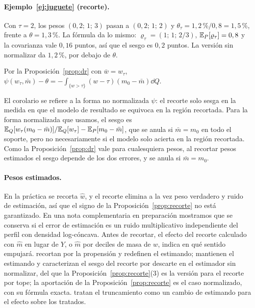 \paragraph{Ejemplo~\ref{ej:juguete} (recorte).} Con $\tau=2$, los pesos $(0,2;\,1;\,3)$ pasan a $(0,2;\,1;\,2)$ y $\theta_\tau=1,2\,\%/0,8=1,5\,\%$, frente a $\theta=1,3\,\%$. La fórmula da lo mismo: $\varrho_\tau=(1;\,1;\,2/3)$, $\mathbb{E}_P[\varrho_\tau]=0,8$ y la covarianza vale $0,16$ puntos, así que el sesgo es $0,2$ puntos. La versión sin normalizar da $1,2\,\%$, por debajo de $\theta$.

\begin{corolario}\label{cor:drrecorte}
Por la Proposición~\ref{prop:dr} con $\bar w=w_\tau$, $\psi(w_\tau,\bar m)-\theta=-\int_{\{w>\tau\}}(w-\tau)(m_0-\bar m)\dd Q$.
\end{corolario}
El corolario se refiere a la forma no normalizada $\psi$: el recorte solo sesga en la medida en que el modelo de resultado se equivoca en la región recortada. Para la forma normalizada que usamos, el sesgo es $\mathbb{E}_Q[w_\tau(m_0-\bar m)]/\mathbb{E}_Q[w_\tau]-\mathbb{E}_P[m_0-\bar m]$, que se anula si $\bar m=m_0$ en todo el soporte, pero no necesariamente si el modelo solo acierta en la región recortada. Como la Proposición~\ref{prop:dr} vale para cualesquiera pesos, al recortar pesos estimados el sesgo depende de los dos errores, y se anula si $\bar m=m_0$.

\paragraph{Pesos estimados.} En la práctica se recorta $\hat w$, y el recorte elimina a la vez peso verdadero y ruido de estimación, así que el signo de la Proposición~\ref{prop:recorte} no está garantizado. En una nota complementaria en preparación mostramos que se conserva si el error de estimación es un ruido multiplicativo independiente del perfil con densidad log-cóncava. Antes de recortar, el efecto del recorte calculado con $\hat m$ en lugar de $Y$, o $\hat m$ por deciles de masa de $\hat w$, indica en qué sentido empujará. \citet{crump2009} recortan por la propensión y redefinen el estimando; \citet{ma2020} mantienen el estimando y caracterizan el sesgo del recorte por descarte en el estimador sin normalizar, del que la Proposición~\ref{prop:recorte}(3) es la versión para el recorte por tope; la aportación de la Proposición~\ref{prop:recorte} es el caso normalizado, con su fórmula exacta. \citet{liu2023} tratan el truncamiento como un cambio de estimando para el efecto sobre los tratados.

